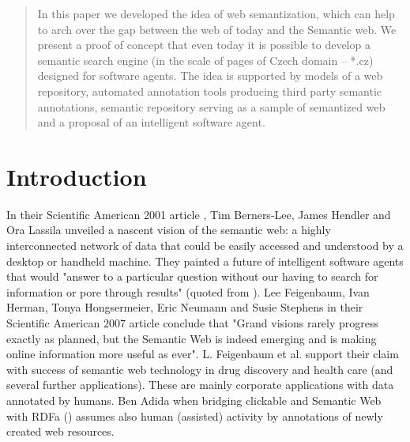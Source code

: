 \documentclass{sig-alternate}
\begin{document}
\date{30 July 2008}
\maketitle
\begin{abstract}
In this paper we developed the idea of web semantization, which can help to arch over the gap between the web of today and the Semantic web. We present a proof of concept that even today it is possible to develop a semantic search engine (in the scale of pages of Czech domain -- *.cz) designed for software agents. The idea is supported by models of a web repository, automated annotation tools producing third party semantic annotations, semantic repository serving as a sample of semantized web and a proposal of an intelligent software agent.
\end{abstract}




\section{Introduction}
In their Scientific American 2001 article \cite{biblio:2001-Berners-Lee-SemanticWeb}, Tim Berners-Lee, James Hendler and Ora Lassila unveiled a nascent vision of the semantic web: a highly interconnected network of data that could be easily accessed and understood by a desktop or handheld machine. They painted a future of intelligent software agents that would "answer to a particular question without our having to search for information or pore through results" (quoted from \cite{biblio:feigenbaum_semantic_2007}). Lee Feigenbaum, Ivan Herman, Tonya Hongsermeier, Eric Neumann and Susie Stephens in their Scientific American 2007 article \cite{biblio:feigenbaum_semantic_2007} conclude that "Grand visions rarely progress exactly as planned, but the Semantic Web is indeed emerging and is making online information more useful as ever". L. Feigenbaum et al. support their claim with success of semantic web technology in drug discovery and health care (and several further applications). These are mainly corporate applications with data annotated by humans. Ben Adida when bridging clickable and Semantic Web with RDFa (\cite{biblio:AdidaClickable}) assumes also human (assisted) activity by annotations of newly created web resources. \par
\end{document}
